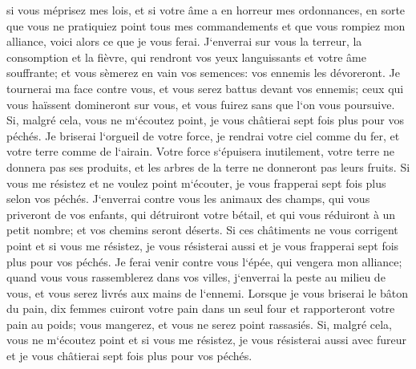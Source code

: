 \verse si vous méprisez mes lois, et si votre âme a en horreur mes ordonnances, en sorte que vous ne pratiquiez point tous mes commandements et que vous rompiez mon alliance, 
\verse voici alors ce que je vous ferai. J`enverrai sur vous la terreur, la consomption et la fièvre, qui rendront vos yeux languissants et votre âme souffrante; et vous sèmerez en vain vos semences: vos ennemis les dévoreront. 
\verse Je tournerai ma face contre vous, et vous serez battus devant vos ennemis; ceux qui vous haïssent domineront sur vous, et vous fuirez sans que l`on vous poursuive. 
\verse Si, malgré cela, vous ne m`écoutez point, je vous châtierai sept fois plus pour vos péchés. 
\verse Je briserai l`orgueil de votre force, je rendrai votre ciel comme du fer, et votre terre comme de l`airain. 
\verse Votre force s`épuisera inutilement, votre terre ne donnera pas ses produits, et les arbres de la terre ne donneront pas leurs fruits. 
\verse Si vous me résistez et ne voulez point m`écouter, je vous frapperai sept fois plus selon vos péchés. 
\verse J`enverrai contre vous les animaux des champs, qui vous priveront de vos enfants, qui détruiront votre bétail, et qui vous réduiront à un petit nombre; et vos chemins seront déserts. 
\verse Si ces châtiments ne vous corrigent point et si vous me résistez, 
\verse je vous résisterai aussi et je vous frapperai sept fois plus pour vos péchés. 
\verse Je ferai venir contre vous l`épée, qui vengera mon alliance; quand vous vous rassemblerez dans vos villes, j`enverrai la peste au milieu de vous, et vous serez livrés aux mains de l`ennemi. 
\verse Lorsque je vous briserai le bâton du pain, dix femmes cuiront votre pain dans un seul four et rapporteront votre pain au poids; vous mangerez, et vous ne serez point rassasiés. 
\verse Si, malgré cela, vous ne m`écoutez point et si vous me résistez, 
\verse je vous résisterai aussi avec fureur et je vous châtierai sept fois plus pour vos péchés. 
